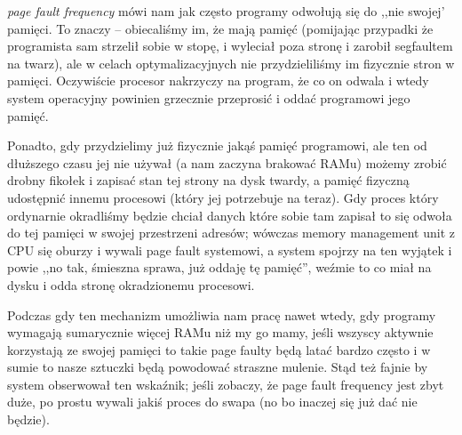 \textit{page fault frequency} mówi nam jak często programy odwołują się do ,,nie swojej' pamięci.
To znaczy -- obiecaliśmy im, że mają pamięć (pomijając przypadki że programista sam strzelił sobie w stopę, i wyleciał poza stronę i zarobił segfaultem na twarz), ale w celach optymalizacyjnych nie przydzieliliśmy im fizycznie stron w pamięci. Oczywiście procesor nakrzyczy na program, że co on odwala i wtedy system operacyjny powinien grzecznie przeprosić i oddać programowi jego pamięć.

Ponadto, gdy przydzielimy już fizycznie jakąś pamięć programowi, ale ten od dłuższego czasu jej nie używał (a nam zaczyna brakować RAMu) możemy zrobić drobny fikołek i zapisać stan tej strony na dysk twardy, a pamięć fizyczną udostępnić innemu procesowi (który jej potrzebuje na teraz). Gdy proces który ordynarnie okradliśmy będzie chciał danych które sobie tam zapisał to się odwoła do tej pamięci w swojej przestrzeni adresów; wówczas memory management unit z CPU się oburzy i wywali page fault systemowi, a system spojrzy na ten wyjątek i powie ,,no tak, śmieszna sprawa, już oddaję tę pamięć'', weźmie to co miał na dysku i odda stronę okradzionemu procesowi.

Podczas gdy ten mechanizm umożliwia nam pracę nawet wtedy, gdy programy wymagają sumarycznie więcej RAMu niż my go mamy, jeśli wszyscy aktywnie korzystają ze swojej pamięci to takie page faulty będą latać bardzo często i w sumie to nasze sztuczki będą powodować straszne mulenie. Stąd też fajnie by system obserwował ten wskaźnik; jeśli zobaczy, że page fault frequency jest zbyt duże, po prostu wywali jakiś proces do swapa (no bo inaczej się już dać nie będzie).
